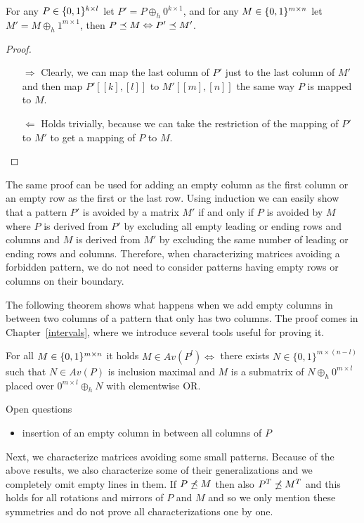 \begin{obs}
\label{obs:emptyrows}
For any $P\in\{0,1\}^{k\times l}$ let $P'=P\oplus_h0^{k\times1}$, and for any $M\in\{0,1\}^{m\times n}$ let $M'=M\oplus_h1^{m\times1}$, then $P\preceq M\Leftrightarrow P'\preceq M'$.
\end{obs}
\begin{proof}
\begin{itemize}
	\item[$\Rightarrow$] Clearly, we can map the last column of $P'$ just to the last column of $M'$ and then map $P'[[k],[l]]$ to $M'[[m],[n]]$ the same way $P$ is mapped to $M$.
	\item[$\Leftarrow$] Holds trivially, because we can take the restriction of the mapping of $P'$ to $M'$ to get a mapping of $P$ to $M$.
\end{itemize}
\end{proof}

The same proof can be used for adding an empty column as the first column or an empty row as the first or the last row. Using induction we can easily show that a pattern $P'$ is avoided by a matrix $M'$ if and only if $P$ is avoided by $M$ where $P$ is derived from $P'$ by excluding all empty leading or ending rows and columns and $M$ is derived from $M'$ by excluding the same number of leading or ending rows and columns. Therefore, when characterizing matrices avoiding a forbidden pattern, we do not need to consider patterns having empty rows or columns on their boundary.

The following theorem shows what happens when we add empty columns in between two columns of a pattern that only has two columns. The proof comes in Chapter~\ref{intervals}, where we introduce several tools useful for proving it.

\begin{thm}
\label{thm:emptymiddle}
For all $M\in\{0,1\}^{m\times n}$ it holds $M\in Av(P^l)\Leftrightarrow$ there exists $N\in\{0,1\}^{m\times(n-l)}$ such that $N\in Av(P)$ is inclusion maximal and $M$ is a submatrix of $N\oplus_h0^{m\times l}$ placed over $0^{m\times l}\oplus_hN$ with elementwise OR.
\end{thm}

Open questions
\begin{itemize}
	\item insertion of an empty column in between all columns of $P$
\end{itemize}

Next, we characterize matrices avoiding some small patterns. Because of the above results, we also characterize some of their generalizations and we completely omit empty lines in them. If $P\not\preceq M$ then also $P^T\not\preceq M^T$ and this holds for all rotations and mirrors of $P$ and $M$ and so we only mention these symmetries and do not prove all characterizations one by one.

